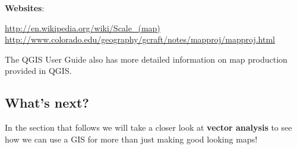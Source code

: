 \textbf{Websites}:

\url{http://en.wikipedia.org/wiki/Scale\_(map)} \\
\url{http://www.colorado.edu/geography/gcraft/notes/mapproj/mapproj.html}

The QGIS User Guide also has more detailed information on map production
provided in QGIS.

\subsection{What's next?}

In the section that follows we will take a closer look at \textbf{vector
analysis} to see how we can use a GIS for more than just making good looking
maps!


